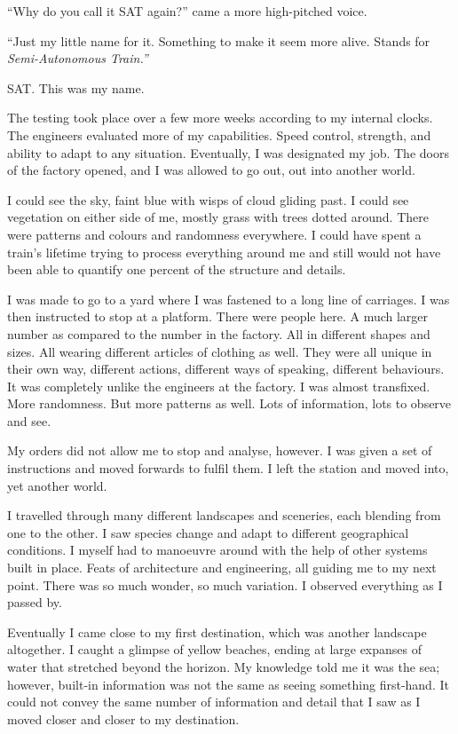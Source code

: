 ``Why do you call it SAT again?'' came a more high-pitched voice.

``Just my little name for it. Something to make it seem more alive. Stands for \emph{Semi-Autonomous Train.''}

SAT. This was my name.

\hsep

The testing took place over a few more weeks according to my internal clocks. The engineers evaluated more of my capabilities. Speed control, strength, and ability to adapt to any situation. Eventually, I was designated my job. The doors of the factory opened, and I was allowed to go out, out into another world.

I could see the sky, faint blue with wisps of cloud gliding past. I could see vegetation on either side of me, mostly grass with trees dotted around. There were patterns and colours and randomness everywhere. I could have spent a train's lifetime trying to process everything around me and still would not have been able to quantify one percent of the structure and details.

I was made to go to a yard where I was fastened to a long line of carriages. I was then instructed to stop at a platform. There were people here. A much larger number as compared to the number in the factory. All in different shapes and sizes. All wearing different articles of clothing as well. They were all unique in their own way, different actions, different ways of speaking, different behaviours. It was completely unlike the engineers at the factory. I was almost transfixed. More randomness. But more patterns as well. Lots of information, lots to observe and see.

My orders did not allow me to stop and analyse, however. I was given a set of instructions and moved forwards to fulfil them. I left the station and moved into, yet another world. 

I travelled through many different landscapes and sceneries, each blending from one to the other. I saw species change and adapt to different geographical conditions. I myself had to manoeuvre around with the help of other systems built in place. Feats of architecture and engineering, all guiding me to my next point. There was so much wonder, so much variation. I observed everything as I passed by.

Eventually I came close to my first destination, which was another landscape altogether. I caught a glimpse of yellow beaches, ending at large expanses of water that stretched beyond the horizon. My knowledge told me it was the sea; however, built-in information was not the same as seeing something first-hand. It could not convey the same number of information and detail that I saw as I moved closer and closer to my destination.

